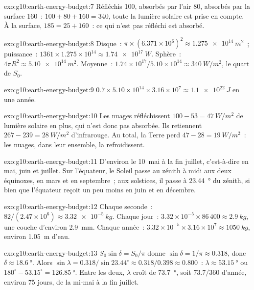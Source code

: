 \begin{solution}{exo:g10:earth-energy-budget:7}
Réfléchis 100, absorbés par l'air 80, absorbés par la surface 160~:
$100 + 80 + 160 = 340$, toute la lumière solaire est prise en compte. À la
surface, $185 = 25 + 160$~: ce qui n'est pas réfléchi est absorbé.
\end{solution}

\begin{solution}{exo:g10:earth-energy-budget:8}
Disque~: $\pi \times (6.371\times10^6)^2 \approx \qty{1.275e14}{m^2}$~;
puissance~: $1361 \times 1.275\times10^{14} \approx \qty{1.74e17}{W}$.
Sphère~: $4\pi
R^2 \approx \qty{5.10e14}{m^2}$. Moyenne~: $1.74\times10^{17}/5.10\times
10^{14} \approx \qty{340}{W/m^2}$, le quart de $S_0$.
\end{solution}

\begin{solution}{exo:g10:earth-energy-budget:9}
$0.7 \times 5.10\times10^{14} \times 3.16\times10^7 \approx
\qty{1.1e22}{J}$ en une année.
\end{solution}

\begin{solution}{exo:g10:earth-energy-budget:10}
Les nuages réfléchissent $100 - 53 = \qty{47}{W/m^2}$ de lumière solaire en
plus, qui n'est donc pas absorbée. Ils retiennent $267 - 239 = \qty{28}{W/m^2}$ d'infrarouge. Au total, la Terre perd
$47 - 28 = \qty{19}{W/m^2}$~: les nuages, dans leur ensemble, la
refroidissent.
\end{solution}

\begin{solution}{exo:g10:earth-energy-budget:11}
D'environ le 10~mai à la fin juillet, c'est-à-dire en mai, juin et juillet.
Sur l'équateur, le Soleil passe au zénith à midi aux deux équinoxes, en mars
et en septembre~; aux solstices, il passe à \qty{23.44}{\degree} du zénith,
si bien que l'équateur reçoit un peu moins en juin et en décembre.
\end{solution}

\begin{solution}{exo:g10:earth-energy-budget:12}
Chaque seconde~: $82/(2.47\times10^6) \approx \qty{3.32e-5}{kg}$. Chaque
jour~: $3.32\times10^{-5} \times 86\,400 \approx \qty{2.9}{kg}$, une couche
d'environ \qty{2.9}{mm}. Chaque année~: $3.32\times10^{-5} \times 3.16\times10^7 \approx
\qty{1050}{kg}$, environ \qty{1.05}{m} d'eau.
\end{solution}

\begin{solution}{exo:g10:earth-energy-budget:13}
$S_0 \sin\delta = S_0/\pi$ donne $\sin\delta = 1/\pi \approx 0.318$, donc
$\delta \approx \qty{18.6}{\degree}$. Alors $\sin\lambda = 0.318/\sin 23.44^\circ
\approx 0.318/0.398 \approx 0.800$~: $\lambda \approx \qty{53.15}{\degree}$ ou
$180^\circ - 53.15^\circ = \qty{126.85}{\degree}$. Entre les deux, $\lambda$
croît de \qty{73.7}{\degree}, soit $73.7/360$ d'année, environ \num{75}
jours, de la mi-mai à la fin juillet.
\end{solution}

